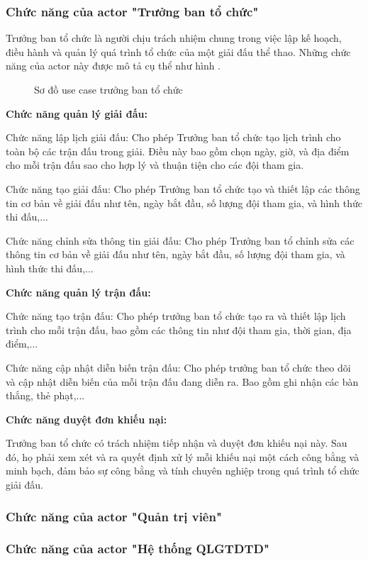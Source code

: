 \subsubsection{Chức năng của actor "Trưởng ban tổ chức"}

Trưởng ban tổ chức là người chịu trách nhiệm chung trong việc lập kế hoạch, điều hành và quản lý quá trình tổ chức của một giải đấu thể thao.
Những chức năng của actor này được mô tả cụ thể như hình
.
\begin{figure}[H]
  \centering
  
  \caption{Sơ đồ use case trưởng ban tổ chức}
  \label{fig:uc-7}
\end{figure}

\noindent
\textbf{Chức năng quản lý giải đấu:}

Chức năng lập lịch giải đấu: Cho phép Trưởng ban tổ chức tạo lịch trình cho toàn bộ các trận đấu trong giải. Điều này bao gồm chọn ngày, giờ, và địa điểm cho mỗi trận đấu sao cho hợp lý và thuận tiện cho các đội tham gia.\par
Chức năng tạo giải đấu: Cho phép Trưởng ban tổ chức tạo và thiết lập các thông tin cơ bản về giải đấu như tên, ngày bắt đầu, số lượng đội tham gia, và hình thức thi đấu,...\par
Chức năng chỉnh sửa thông tin giải đấu: Cho phép Trưởng ban tổ chỉnh sửa các thông tin cơ bản về giải đấu như tên, ngày bắt đầu, số lượng đội tham gia, và hình thức thi đấu,...

\noindent
\textbf{Chức năng quản lý trận đấu:}

Chức năng tạo trận đấu: Cho phép trưởng ban tổ chức tạo ra và thiết lập lịch trình cho mỗi trận đấu, bao gồm các thông tin như đội tham gia, thời gian, địa điểm,...\par
Chức năng cập nhật diễn biến trận đấu: Cho phép trưởng ban tổ chức theo dõi và cập nhật diễn biến của mỗi trận đấu đang diễn ra. Bao gồm ghi nhận các bàn thắng, thẻ phạt,...

\noindent
\textbf{Chức năng duyệt đơn khiếu nại:}

Trưởng ban tổ chức có trách nhiệm tiếp nhận và duyệt đơn khiếu nại này. Sau đó, họ phải xem xét và ra quyết định xử lý mỗi khiếu nại một cách công bằng và minh bạch, đảm bảo sự công bằng và tính chuyên nghiệp trong quá trình tổ chức giải đấu.


\subsubsection{Chức năng của actor "Quản trị viên"}

\subsubsection{Chức năng của actor "Hệ thống QLGTDTD"}
